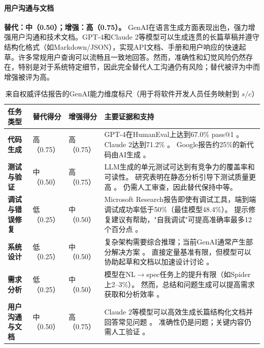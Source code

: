\paragraph{用户沟通与文档}
\textbf{替代：中（0.50）；增强：高（0.75）。}
GenAI在语言生成方面表现出色，强力增强用户沟通和技术文档。GPT-4和Claude 2等模型可以生成连贯的长篇草稿并遵守结构化格式（如Markdown/JSON），实现API文档、手册和用户响应的快速起草。许多常规用户查询可以流畅且一致地回答。然而，准确性和幻觉风险仍然存在，特别是对于系统特定细节，因此完全替代人工沟通仍有风险；替代被评为中而增强被评为高。

\begin{table}[htbp]
\centering
\caption{来自权威评估报告的GenAI能力维度标尺（用于将软件开发人员任务映射到 $s/c$）}
\label{tab:genai_capability_rubric_en}
\begin{tabular}{p{2.6cm} p{2.2cm} p{2.2cm} p{7.2cm}}
\toprule
任务类型 & 替代得分 & 增强得分 & 主要证据和支持 \\
\midrule
\textbf{代码生成} & 高（0.75） & 高（0.75） &
GPT-4在HumanEval上达到67.0\% pass@1 \cite{openai2023gpt4}。\newline
Claude 2达到71.2\% \cite{anthropic2023claude2}。\newline
Google报告约25\%的新代码由AI生成 \cite{techcrunch2025aimodels}。 \\
\textbf{测试与验证} & 中（0.50） & 高（0.75） &
LLM生成的单元测试可达到有竞争力的覆盖率和可读性。\newline
研究表明在静态分析引导下测试质量更高 \cite{arxiv2024unittest}。\newline
仍需人工审查，因此替代保持中等。 \\
\textbf{调试与错误修复} & 低（0.25） & 中（0.50） &
Microsoft Research报告即使有调试工具，端到端调试成功率低于50\%（最佳模型48.4\%）\cite{techcrunch2025aimodels}。\newline
提示修复建议有帮助，"自我调试"可提高准确率最多12个百分点 \cite{chen2023selfdebugging}。 \\
\textbf{系统设计} & 低（0.25） & 中（0.50） &
复杂架构需要综合推理；当前GenAI通常产生部分解决方案 \cite{openai2023gpt4}。\newline
直接定量基准有限，但模型可以协助起草和文档以加速设计讨论 \cite{googleresearch2024seqmodels}。 \\
\textbf{需求分析} & 低（0.25） & 中（0.50） &
模型在NL$\rightarrow$spec任务上的提升有限（如Spider上2--3\%）\cite{chen2023selfdebugging}。\newline
然而，总结和问题生成可以提高需求获取和分析效率 \cite{openai2023gpt4}。 \\
\textbf{用户沟通与文档} & 中（0.50） & 高（0.75） &
Claude 2等模型可以高效生成长篇结构化文档并回答常见问题 \cite{anthropic2023claude2}。\newline
准确性仍是问题；关键内容仍需人工验证 \cite{openai2023gpt4}。 \\
\bottomrule
\end{tabular}
\end{table}

